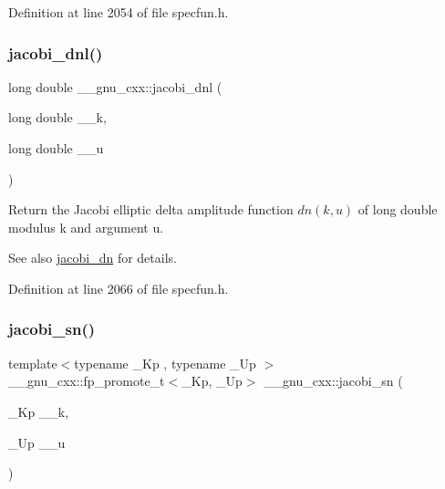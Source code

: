 Definition at line 2054 of file specfun.\+h.

\mbox{\label{group__mathsf__gnu_gae59786991abbf8359deef49b6323065a}} 
\subsubsection{\texorpdfstring{jacobi\+\_\+dnl()}{jacobi\_dnl()}}
{\footnotesize\ttfamily long double \+\_\+\+\_\+gnu\+\_\+cxx\+::jacobi\+\_\+dnl (\begin{DoxyParamCaption}\item[{long double}]{\+\_\+\+\_\+k,  }\item[{long double}]{\+\_\+\+\_\+u }\end{DoxyParamCaption})\hspace{0.3cm}{\ttfamily [inline]}}

Return the Jacobi elliptic delta amplitude function $ dn(k,u) $ of {\ttfamily long double} modulus {\ttfamily k} and argument {\ttfamily u}.

\begin{DoxySeeAlso}{See also}
\hyperlink{group__mathsf__gnu_ga0f8fa8d6a77dbc2089d65f3f16876aa9}{jacobi\+\_\+dn} for details. 
\end{DoxySeeAlso}


Definition at line 2066 of file specfun.\+h.

\mbox{\label{group__mathsf__gnu_ga49d5e18152dd0dd0f496b8c8582e7045}} 
\subsubsection{\texorpdfstring{jacobi\+\_\+sn()}{jacobi\_sn()}}
{\footnotesize\ttfamily template$<$typename \+\_\+\+Kp , typename \+\_\+\+Up $>$ \\
\+\_\+\+\_\+gnu\+\_\+cxx\+::fp\+\_\+promote\+\_\+t$<$\+\_\+\+Kp, \+\_\+\+Up$>$ \+\_\+\+\_\+gnu\+\_\+cxx\+::jacobi\+\_\+sn (\begin{DoxyParamCaption}\item[{\+\_\+\+Kp}]{\+\_\+\+\_\+k,  }\item[{\+\_\+\+Up}]{\+\_\+\+\_\+u }\end{DoxyParamCaption})\hspace{0.3cm}{\ttfamily [inline]}}

